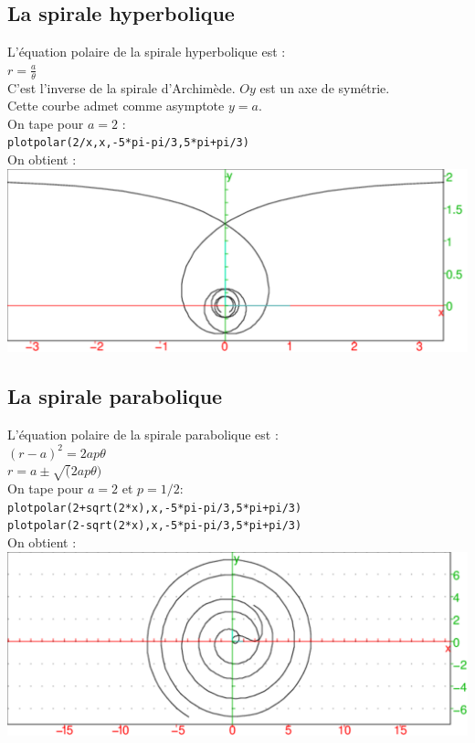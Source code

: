 \documentclass[a4paper,11pt]{book}
\begin{document}
\subsection{La spirale hyperbolique}
L'\'equation polaire de la spirale  hyperbolique est :\\
$\displaystyle r=\frac{a}{\theta}$\\
C'est l'inverse de la  spirale d'Archim\`ede.
$Oy$ est un axe de sym\'etrie.\\
Cette courbe admet comme asymptote $y=a$.\\ 
On tape pour $a=2$ :\\
{\tt plotpolar(2/x,x,-5*pi-pi/3,5*pi+pi/3)}\\
On obtient :\\
\includegraphics[width=\textwidth]{spiral0}
\subsection{La spirale parabolique}
L'\'equation polaire de la spirale  parabolique est :\\
$\displaystyle (r-a)^2 =2ap\theta$\\
$\displaystyle r=a \pm \sqrt(2ap\theta)$\\
On tape pour $a=2$ et $p=1/2$:\\
{\tt plotpolar(2+sqrt(2*x),x,-5*pi-pi/3,5*pi+pi/3)}\\
{\tt plotpolar(2-sqrt(2*x),x,-5*pi-pi/3,5*pi+pi/3)}\\
On obtient :\\
\includegraphics[width=\textwidth]{spiral8}
\end{document}
